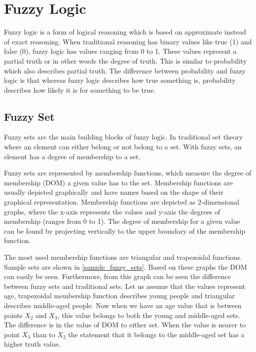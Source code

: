 \section{Fuzzy Logic}


Fuzzy logic is a form of logical reasoning which is based on approximate instead of exact reasoning. When traditional reasoning has binary values like true (1) and false (0), fuzzy logic has values ranging from 0 to 1. These values represent a partial truth or in other words the degree of truth. This is similar to probability which also describes partial truth. The difference between probability and fuzzy logic is that whereas fuzzy logic describes how true something is, probability describes how likely it is for something to be true. 

\subsection{Fuzzy Set}
Fuzzy sets are the main building blocks of fuzzy logic. In traditional set theory where an element can either belong or not belong to a set. With fuzzy sets, an element has a degree of membership to a set. 

Fuzzy sets are represented by membership functions, which measure the degree of membership (DOM) a given value has to the set. Membership functions are usually depicted graphically and have names based on the shape of their graphical representation. Membership functions are depicted as 2-dimensional graphs, where the x-axis represents the values and y-axis the degrees of membership (ranges from 0 to 1). The degree of membership for a given value can be found by projecting vertically to the upper boundary of the membership function. 

The most used membership functions are triangular and trapezoidal functions. Sample sets are shown in \autoref{sample_fuzzy_sets}. Based on these graphs the DOM can easily be seen. Furthermore, from this graph can be seen the difference between fuzzy sets and traditional sets. Let us assume that the values represent age, trapezoidal membership function describes young people and triangular describes middle-aged people. Now when we have an age value that is between points $X_2$ and $X_3$, this value belongs to both the young and middle-aged sets. The difference is in the value of DOM to either set. When the value is nearer to point $X_3$ than to $X_2$ the statement that it belongs to the middle-aged set has a higher truth value.  


